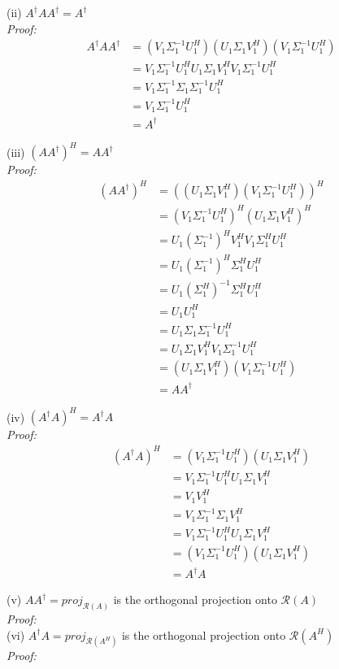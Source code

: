 \documentclass[letterpaper,12pt]{article}
\theoremstyle{definition}
\begin{document}
(ii) $A^\dagger AA^\dagger = A^\dagger $ \\
\textit{Proof:}
\begin{align*}
  A^\dagger AA^\dagger &= (V_1 \Sigma_1^{-1} U_1^H) (U_1 \Sigma_1 V_1^H) (V_1 \Sigma_1^{-1} U_1^H) \\
  &= V_1 \Sigma_1^{-1} U_1^H U_1 \Sigma_1 V_1^H V_1 \Sigma_1^{-1} U_1^H \\
  &= V_1 \Sigma_1^{-1} \Sigma_1 \Sigma_1^{-1} U_1^H \\
  &= V_1 \Sigma_1^{-1} U_1^H \\
  &= A^\dagger
\end{align*}

(iii) $(AA^\dagger)^H = AA^\dagger $ \\
\textit{Proof:}
\begin{align*}
  (A A^\dagger)^H &= ((U_1 \Sigma_1 V_1^H) (V_1 \Sigma_1^{-1} U_1^H))^H \\
  &= (V_1 \Sigma_1^{-1} U_1^H)^H (U_1 \Sigma_1 V_1^H)^H \\
  &= U_1 (\Sigma_1^{-1})^H V_1^H V_1 \Sigma_1^H U_1^H \\
  &= U_1 (\Sigma_1^{-1})^H \Sigma_1^H U_1^H \\
  &= U_1 (\Sigma_1^H)^{-1} \Sigma_1^H U_1^H \\
  &= U_1 U_1^H \\
  &= U_1 \Sigma_1 \Sigma_1^{-1} U_1^H \\
  &= U_1 \Sigma_1 V_1^H V_1 \Sigma_1^{-1} U_1^H \\
  &= (U_1 \Sigma_1 V_1^H) (V_1 \Sigma_1^{-1} U_1^H) \\
  &= A A^\dagger
\end{align*}

(iv) $(A^\dagger A)^H = A^\dagger A $ \\
\textit{Proof:}
\begin{align*}
  (A^\dagger A)^H &= (V_1 \Sigma_1^{-1} U_1^H)(U_1 \Sigma_1 V_1^H) \\
  &= V_1 \Sigma_1^{-1} U_1^H U_1 \Sigma_1 V_1^H \\
  &= V_1 V_1^H \\
  &= V_1 \Sigma_1^{-1} \Sigma_1 V_1^H \\
  &= V_1 \Sigma_1^{-1} U_1^H U_1 \Sigma_1 V_1^H \\
  &= (V_1 \Sigma_1^{-1} U_1^H)(U_1 \Sigma_1 V_1^H) \\
  &= A^\dagger A
\end{align*}

(v) $AA^\dagger = proj_{\mathscr{R}(A)}$ is the orthogonal projection onto $\mathscr{R}(A)$ \\
\textit{Proof:} \\

(vi) $A^\dagger A = proj_{\mathscr{R}(A^H)}$ is the orthogonal projection onto $\mathscr{R}(A^H)$\\
\textit{Proof:} \\
\end{document}
